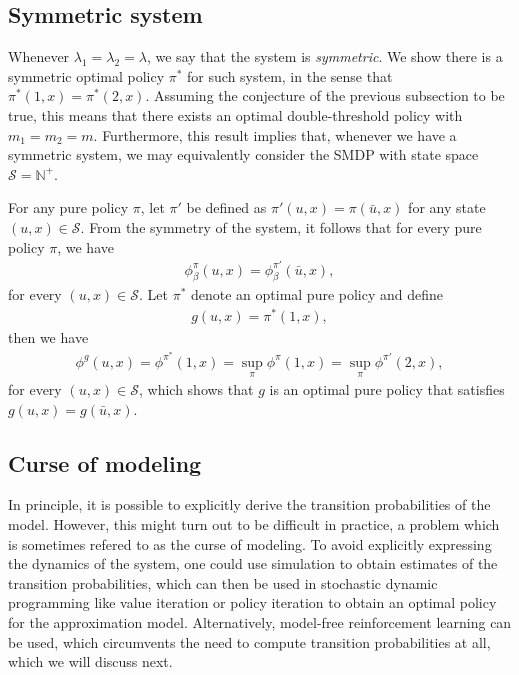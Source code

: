 \documentclass{article}
\theoremstyle{definition}
\theoremstyle{plain}
\begin{document}
\subsection{Symmetric system}
\label{sec:symmetric_system}

Whenever $\lambda_{1} = \lambda_{2} = \lambda$, we say that the system is
\textit{symmetric}. We show there is a symmetric optimal policy $\pi^{*}$ for
such system, in the sense that $\pi^{*}(1,x) = \pi^{*}(2,x)$. Assuming the
conjecture of the previous subsection to be true, this means that there exists
an optimal double-threshold policy with $m_{1} = m_{2} = m$. Furthermore, this
result implies that, whenever we have a symmetric system, we may equivalently
consider the SMDP with state space $\mathcal{S} = \mathbb{N}^{+}$.

For any pure policy $\pi$, let $\pi'$ be defined as
$\pi'(u, x) = \pi(\bar{u}, x)$ for any state $(u, x) \in \mathcal{S}$. From the
symmetry of the system, it follows that for every pure policy $\pi$, we have
\begin{align}
  \phi_{\beta}^{\pi}(u, x) = \phi_{\beta}^{\pi'}(\bar{u}, x) ,
\end{align}
for every $(u, x) \in \mathcal{S}$. Let $\pi^{*}$ denote an optimal pure policy
and define
\begin{align}
g(u, x) = \pi^{*}(1, x) ,
\end{align}
then we have
\begin{align}
  \phi^{g}(u, x) = \phi^{\pi^{*}}(1, x) = \sup_{\pi} \phi^{\pi} (1, x) = \sup_{\pi} \phi^{\pi'} (2, x) ,
\end{align}
for every $(u, x) \in \mathcal{S}$, which shows that $g$ is an optimal pure
policy that satisfies $g(u, x) = g(\bar{u}, x)$.



\subsection{Curse of modeling}

In principle, it is possible to explicitly derive the transition probabilities
of the model. However, this might turn out to be difficult in practice, a
problem which is sometimes refered to as the curse of modeling. To avoid
explicitly expressing the dynamics of the system, one could use simulation to
obtain estimates of the transition probabilities, which can then be used in
stochastic dynamic programming like value iteration or policy iteration to
obtain an optimal policy for the approximation model.
%
Alternatively, model-free reinforcement learning can be used, which circumvents
the need to compute transition probabilities at all, which we will discuss next.
\end{document}
